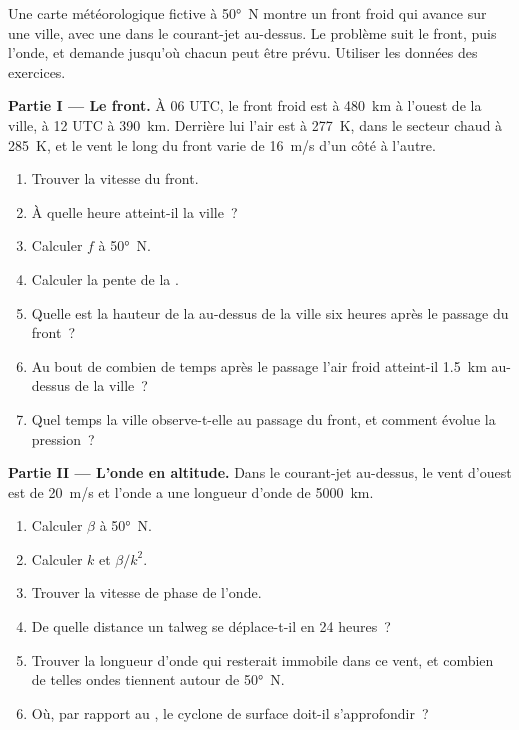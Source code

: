 \begin{problem}\label{pb:b2:weather-systems:1}
Une carte météorologique fictive à \ang{50}~N montre un front froid qui avance sur une ville, avec une 
dans le courant-jet au-dessus. Le problème suit le front, puis l'onde, et demande jusqu'où chacun peut être prévu. Utiliser
les données des exercices.

\medskip\noindent\textbf{Partie I --- Le front.}
À 06 UTC, le front froid est à \qty{480}{km} à l'ouest de la ville, à 12 UTC à \qty{390}{km}. Derrière lui
l'air est à \qty{277}{K}, dans le secteur chaud à \qty{285}{K}, et le vent le long du front
varie de \qty{16}{m/s} d'un côté à l'autre.
\begin{enumerate}
  \item Trouver la vitesse du front.
  \item À quelle heure atteint-il la ville~?
  \item Calculer $f$ à \ang{50}~N.
  \item Calculer la pente de la .
  \item Quelle est la hauteur de la  au-dessus de la ville six heures après le passage du front~?
  \item Au bout de combien de temps après le passage l'air froid atteint-il \qty{1.5}{km} au-dessus de la ville~?
  \item Quel temps la ville observe-t-elle au passage du front, et comment évolue la pression~?
\end{enumerate}

\medskip\noindent\textbf{Partie II --- L'onde en altitude.}
Dans le courant-jet au-dessus, le vent d'ouest est de \qty{20}{m/s} et l'onde a une longueur d'onde de \qty{5000}{km}.
\begin{enumerate}[resume]
  \item Calculer $\beta$ à \ang{50}~N.
  \item Calculer $k$ et $\beta/k^2$.
  \item Trouver la vitesse de phase de l'onde.
  \item De quelle distance un talweg se déplace-t-il en 24 heures~?
  \item Trouver la longueur d'onde qui resterait immobile dans ce vent, et combien de telles ondes tiennent
         autour de \ang{50}~N.
  \item Où, par rapport au , le cyclone de surface doit-il s'approfondir~?
\end{enumerate}


\end{problem}
